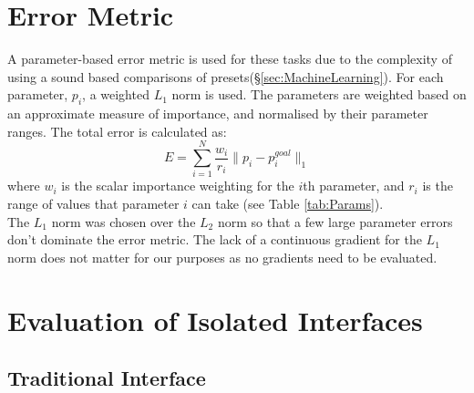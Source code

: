 \documentclass[11pt, oneside]{report}   	%
\begin{document}
\section{Error Metric}\label{sec:ErrorMetric}
\vspace{-5pt}
A parameter-based error metric is used for these tasks due to the complexity of using a sound based comparisons of presets(\S \ref{sec:MachineLearning}).
For each parameter, $p_i$, a weighted $L_1$ norm is used. The parameters are weighted based on an approximate measure of importance, and normalised by their parameter ranges. The total error is calculated as:
\begin{equation}
E = \sum_{i=1}^{N}\frac{w_i}{r_i} \| p_i - p_i^{goal} \|_1 
\end{equation}
where $w_i$ is the scalar importance weighting for the $i$th parameter, and $r_i$ is the range of values that parameter $i$ can take (see Table \ref{tab:Params}).\\
The $L_1$ norm was chosen over the $L_2$ norm so that a few large parameter errors don't dominate the error metric. The lack of a continuous gradient for the $L_1$ norm does not matter for our purposes as no gradients need to be evaluated.
\vspace{-10pt}
\section{Evaluation of Isolated Interfaces}
\subsection{Traditional Interface}\label{sec:TradEval}
\vspace{-5pt}
%	
%	
%	
\end{document}
